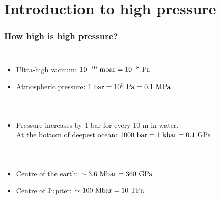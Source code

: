 \section{Introduction to high pressure}
\begin{frame}[label=PressureScales]
\frametitle{How high is high pressure?}
\begin{columns}[t]
\begin{itemize}[<+->]
\item
Ultra-high vacuum: $10^{-10}~{\rm mbar} = 10^{-8}~ {\rm Pa}$.

\item
Atmospheric pressure: $1~{\rm bar} = 10^5 ~ {\rm Pa} = 0.1 ~{\rm MPa}$
\end{itemize}

\centerline{~}
\end{columns}

\begin{columns}[t]
\begin{itemize}[<+->]
\item
Pressure increases by 1 bar for every 10 m in water. \\
At the bottom of deepest ocean: $1000~{\rm bar} = 1~{\rm kbar} = 0.1~{\rm GPa}$
\end{itemize}

\centerline{~}
\end{columns}

\begin{columns}[t]
\begin{itemize}[<+->]
\item
Centre of the earth: $\sim 3.6 ~{\rm Mbar} = 360 ~{\rm GPa}$

\item
Centre of Jupiter: $\sim 100~{\rm Mbar} = 10 ~{\rm TPa}$
\end{itemize}

\centerline{~}
\end{columns}
\end{frame}



